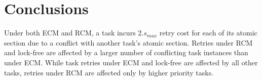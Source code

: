 \documentclass{sig-alternate}
\begin{document}

\section{Conclusions}
\label{sec:conclusions}

Under both ECM and RCM,  
a task incurs $2.s_{max}$ retry cost for each of its atomic section due to a conflict with another task's atomic section. Retries under RCM and lock-free are affected by a larger number of conflicting task instances than under ECM. While task retries under ECM and lock-free are affected by all other tasks, retries under RCM are affected only by higher priority tasks. 
\end{document}
